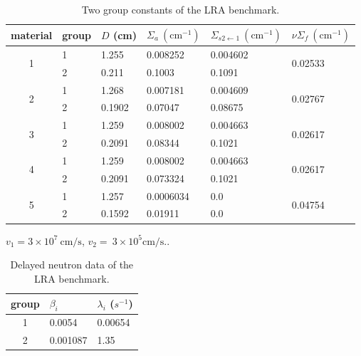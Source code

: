 \documentclass[review,number,sort&compress,12pt]{elsarticle}
\begin{document}
\begin{table}[H]
	\begin{threeparttable}	
		\centering
		\begin{tabular}{c|l|l|l|l|l}
			material & group  & $D$ (cm) & $\Sigma_{a} ~ (\text{cm}^{-1})$ & $\Sigma_{s2\gets 1}~ (\text{cm}^{-1})$ & $\nu\Sigma_{f}~ (\text{cm}^{-1})$ \\
			\hline
			\multirow{2}{*}{1}& 1   & 1.255  &  0.008252   & 0.004602 &  \multirow{2}{*}{0.02533} 	\\
			& 2   & 0.211  &  0.1003     &  0.1091  &  \\
			\hline
			\multirow{2}{*}{2}& 1   & 1.268  &  0.007181    & 0.004609  & \multirow{2}{*}{0.02767}  \\	
			& 2   & 0.1902 &  0.07047     & 0.08675   &  \\
			\hline
			
			\multirow{2}{*}{3}& 1   & 1.259  &  0.008002    & 0.004663 & \multirow{2}{*}{0.02617} \\	
			& 2   & 0.2091 &  0.08344     &   0.1021 &                          \\
			\hline
			\multirow{2}{*}{4}& 1   & 1.259  &  0.008002    & 0.004663 &  \multirow{2}{*}{0.02617} \\	
			& 2   & 0.2091 &  0.073324    & 0.1021   &                           \\
			\hline
			\multirow{2}{*}{5}& 1   & 1.257  &  0.0006034   &   0.0    & \multirow{2}{*}{0.04754}\\	
			& 2   & 0.1592 &   0.01911    &   0.0    &  \\
			\hline
		\end{tabular}
		\begin{tablenotes}
			\item $v_1 = 3\times10^{7} ~\text{cm/s} $,  $v_2 = ~3\times10^{5} \text{cm/s}.$.
		\end{tablenotes}
	\end{threeparttable}
	\caption{Two group constants of the LRA benchmark.}
\end{table}


\begin{table}[H]
	\centering
	\begin{tabular}{c|l|l}
		group & $\beta_i$  & $\lambda_i$ ($s^{-1}$)  \\
		\hline
		1    &  0.0054 & 0.00654 \\
		2    &  0.001087 & 1.35  \\
		\hline
	\end{tabular}
	\caption{Delayed neutron data of the LRA benchmark.}
	\label{tab:precursor data}
\end{table}
\end{document}
